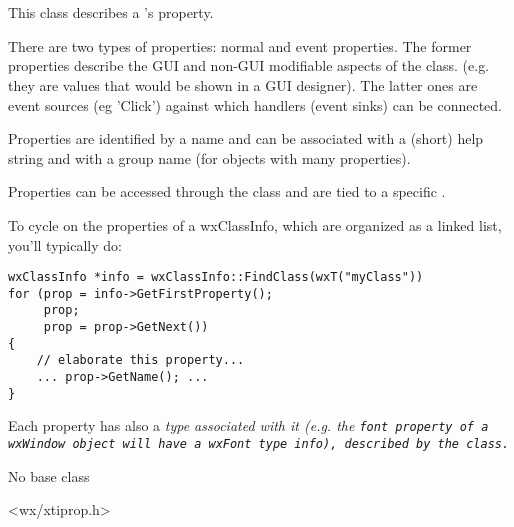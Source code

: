 

\section{}\label{wxpropertyinfo}

This class describes a 's property.

There are two types of properties: normal and event properties.
The former properties describe the GUI and non-GUI modifiable aspects of the class.
(e.g. they are values that would be shown in a GUI designer).
The latter ones are event sources (eg 'Click') against which handlers (event sinks) can be connected.

Properties are identified by a name and can be associated with a (short) help string and with a group name
(for objects with many properties).

Properties can be accessed through the  class and
are tied to a specific .

To cycle on the properties of a wxClassInfo, which are organized as a linked list, you'll typically do:

\begin{verbatim}
wxClassInfo *info = wxClassInfo::FindClass(wxT("myClass"))
for (prop = info->GetFirstProperty();
     prop;
     prop = prop->GetNext())
{
    // elaborate this property...
    ... prop->GetName(); ...
}
\end{verbatim}

Each property has also a \it{type} associated with it (e.g. the \tt{font} property of a \tt{wxWindow}
object will have a {wxFont} type info), described by the  class.



No base class


<wx/xtiprop.h>


